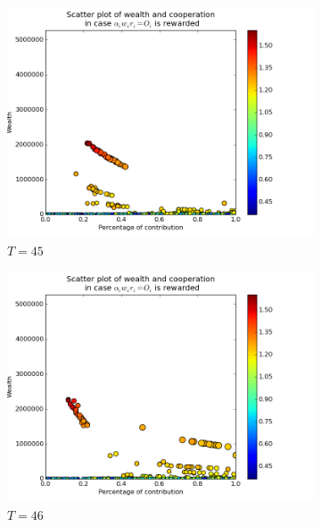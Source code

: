 \documentclass{article}
\begin{document}
\begin{figure}[h]
\begin{subfigure}[t]{0.333\textwidth}
\centering
\includegraphics[width=\textwidth]{nq_output_scatter/scatter_ranking_1_045.png}
\caption{$T = 45$}
\end{subfigure}%
%
\hfill
%
\begin{subfigure}[t]{0.333\textwidth}
\centering
\includegraphics[width=\textwidth]{nq_output_scatter/scatter_ranking_1_046.png}
\caption{$T = 46$}
\end{subfigure}%
%
\hfill
%
\begin{subfigure}[t]{0.333\textwidth}
\centering

\end{subfigure}
\end{figure}
\end{document}

